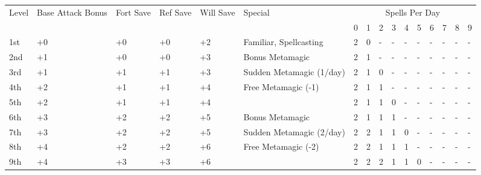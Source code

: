 
\vspace{-8pt}






 
\begin{table}[htb]
\begin{small}
\begin{tabular}{lp{1.2cm}p{0.7cm}p{0.7cm}p{0.7cm}p{4.7cm}llllllllll}
Level  &Base Attack  Bonus &Fort Save &Ref Save &Will Save &Special                  & \multicolumn{10}{c}{Spells Per Day}\\
       &                   &          &         &          &                         &0 &1 &2 &3 &4 &5 &6 &7 &8 &9 \\
1st    &+0                 &+0        &+0       &+2        & Familiar, Spellcasting  &2 &0 &- &- &- &- &- &- &- &- \\
2nd    &+1                 &+0        &+0       &+3        & Bonus Metamagic         &2 &1 &- &- &- &- &- &- &- &- \\
3rd    &+1                 &+1        &+1       &+3        & Sudden Metamagic (1/day)&2 &1 &0 &- &- &- &- &- &- &- \\
4th    &+2                 &+1        &+1       &+4        & Free Metamagic (-1)     &2 &1 &1 &- &- &- &- &- &- &- \\
5th    &+2                 &+1        &+1       &+4        &                         &2 &1 &1 &0 &- &- &- &- &- &- \\
6th    &+3                 &+2        &+2       &+5        & Bonus Metamagic         &2 &1 &1 &1 &- &- &- &- &- &- \\
7th    &+3                 &+2        &+2       &+5        & Sudden Metamagic (2/day)&2 &2 &1 &1 &0 &- &- &- &- &- \\
8th    &+4                 &+2        &+2       &+6        & Free Metamagic (-2)     &2 &2 &1 &1 &1 &- &- &- &- &- \\
9th    &+4                 &+3        &+3       &+6        &                         &2 &2 &2 &1 &1 &0 &- &- &- &- \\

\end{tabular}
\end{small}
\end{table}
